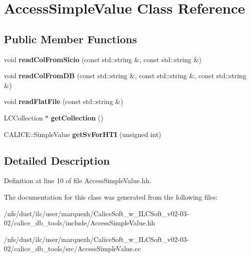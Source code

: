 \section{Access\-Simple\-Value Class Reference}
\label{classAccessSimpleValue}
\subsection*{Public Member Functions}
\begin{DoxyCompactItemize}
\item 
void {\bfseries read\-Col\-From\-Slcio} (const std\-::string \&, const std\-::string \&)\label{classAccessSimpleValue_abac4c443e8222c02fd52ab3a96430e34}

\item 
void {\bfseries read\-Col\-From\-D\-B} (const std\-::string \&, const std\-::string \&, const std\-::string \&)\label{classAccessSimpleValue_a2389c23a3191ff1938173ca367bc9b7e}

\item 
void {\bfseries read\-Flat\-File} (const std\-::string \&)\label{classAccessSimpleValue_a59176d244bc2f3c23b62ea6e773917e7}

\item 
L\-C\-Collection $\ast$ {\bfseries get\-Collection} ()\label{classAccessSimpleValue_ae09c7539b411b2cc91ee46ddd872b0b4}

\item 
C\-A\-L\-I\-C\-E\-::\-Simple\-Value {\bfseries get\-Sv\-For\-H\-T\-I} (unsigned int)\label{classAccessSimpleValue_ae27b972e0c906b353d1b04b2df2974ae}

\end{DoxyCompactItemize}


\subsection{Detailed Description}


Definition at line 10 of file Access\-Simple\-Value.\-hh.



The documentation for this class was generated from the following files\-:\begin{DoxyCompactItemize}
\item 
/nfs/dust/ilc/user/marquezh/\-Calice\-Soft\-\_\-w\-\_\-\-I\-L\-C\-Soft\-\_\-v02-\/03-\/02/calice\-\_\-db\-\_\-tools/include/Access\-Simple\-Value.\-hh\item 
/nfs/dust/ilc/user/marquezh/\-Calice\-Soft\-\_\-w\-\_\-\-I\-L\-C\-Soft\-\_\-v02-\/03-\/02/calice\-\_\-db\-\_\-tools/src/Access\-Simple\-Value.\-cc\end{DoxyCompactItemize}
